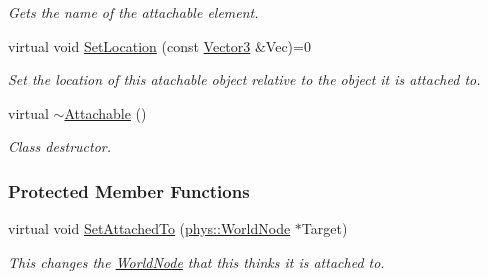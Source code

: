 \begin{DoxyCompactItemize}
\begin{DoxyCompactList}\small\item\em Gets the name of the attachable element. \item\end{DoxyCompactList}\item 
virtual void \hyperlink{classphys_1_1Attachable_a3555ca694cfc9ff96665c16b3e95c698}{SetLocation} (const \hyperlink{classphys_1_1Vector3}{Vector3} \&Vec)=0
\begin{DoxyCompactList}\small\item\em Set the location of this atachable object relative to the object it is attached to. \item\end{DoxyCompactList}\item 
\hypertarget{classphys_1_1Attachable_af7187e29053b7fe339634394883729d4}{
virtual \hyperlink{classphys_1_1Attachable_af7187e29053b7fe339634394883729d4}{$\sim$Attachable} ()}
\label{classphys_1_1Attachable_af7187e29053b7fe339634394883729d4}

\begin{DoxyCompactList}\small\item\em Class destructor. \item\end{DoxyCompactList}\end{DoxyCompactItemize}
\subsubsection*{Protected Member Functions}
\begin{DoxyCompactItemize}
\item 
virtual void \hyperlink{classphys_1_1Attachable_a6f06a8c9950d5a9bfec0c73792cdd65f}{SetAttachedTo} (\hyperlink{classphys_1_1WorldNode}{phys::WorldNode} $\ast$Target)
\begin{DoxyCompactList}\small\item\em This changes the \hyperlink{classphys_1_1WorldNode}{WorldNode} that this thinks it is attached to. \item\end{DoxyCompactList}\end{DoxyCompactItemize}
